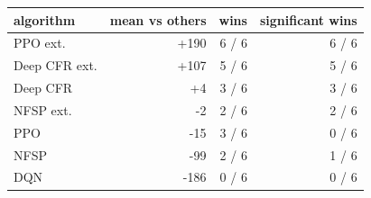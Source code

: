 \begin{tabular}{lrrr}
\toprule
algorithm & mean vs others & wins & significant wins \\
\midrule
PPO ext. & +190 & 6 / 6 & 6 / 6 \\
Deep CFR ext. & +107 & 5 / 6 & 5 / 6 \\
Deep CFR & +4 & 3 / 6 & 3 / 6 \\
NFSP ext. & -2 & 2 / 6 & 2 / 6 \\
PPO & -15 & 3 / 6 & 0 / 6 \\
NFSP & -99 & 2 / 6 & 1 / 6 \\
DQN & -186 & 0 / 6 & 0 / 6 \\
\bottomrule
\end{tabular}
